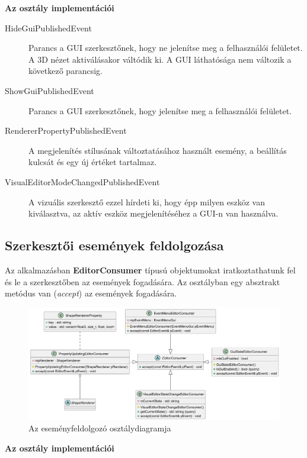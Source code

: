 \textbf{Az osztály implementációi}

\begin{description}
	\item[HideGuiPublishedEvent] Parancs a GUI szerkesztőnek, hogy ne jelenítse meg a felhasználói felületet. A 3D nézet aktiválásakor váltódik ki. A GUI láthatósága nem változik a következő parancsig.
	\item[ShowGuiPublishedEvent] Parancs a GUI szerkesztőnek, hogy jelenítse meg a felhasználói felületet.
	\item[RendererPropertyPublishedEvent] A megjelenítés stílusának változtatásához használt esemény, a beállítás kulcsát és egy új értéket tartalmaz.
	\item[VisualEditorModeChangedPublishedEvent] A vizuális szerkesztő ezzel hírdeti ki, hogy épp milyen eszköz van kiválasztva, az aktív eszköz megjelenítéséhez a GUI-n van használva.
\end{description}

\subsection{Szerkesztői események feldolgozása}

Az alkalmazásban \textbf{EditorConsumer} típusú objektumokat iratkoztathatunk fel és le a szerkesztőben az események fogadására. Az osztályban egy absztrakt metódus van (\textit{accept}) az események fogadására.

\begin{figure}[H]
	\centering
	\includegraphics[width=1\linewidth]{images/class_editor_consumer.png}
	\caption{Az eseményfeldolgozó osztálydiagramja}
	\label{fig:class_editor_consumer-1}
\end{figure}

\textbf{Az osztály implementációi}

